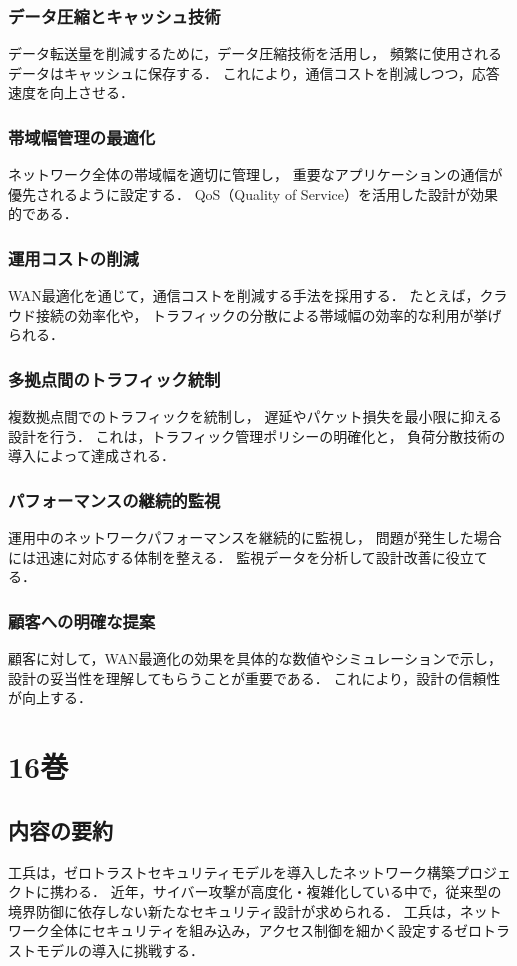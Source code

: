 \documentclass[titlepage,a4paper]{jsarticle}
\begin{document}
\subsubsection{データ圧縮とキャッシュ技術}
データ転送量を削減するために，データ圧縮技術を活用し，
頻繁に使用されるデータはキャッシュに保存する．
これにより，通信コストを削減しつつ，応答速度を向上させる．

\subsubsection{帯域幅管理の最適化}
ネットワーク全体の帯域幅を適切に管理し，
重要なアプリケーションの通信が優先されるように設定する．
QoS（Quality of Service）を活用した設計が効果的である．

\subsubsection{運用コストの削減}
WAN最適化を通じて，通信コストを削減する手法を採用する．
たとえば，クラウド接続の効率化や，
トラフィックの分散による帯域幅の効率的な利用が挙げられる．

\subsubsection{多拠点間のトラフィック統制}
複数拠点間でのトラフィックを統制し，
遅延やパケット損失を最小限に抑える設計を行う．
これは，トラフィック管理ポリシーの明確化と，
負荷分散技術の導入によって達成される．

\subsubsection{パフォーマンスの継続的監視}
運用中のネットワークパフォーマンスを継続的に監視し，
問題が発生した場合には迅速に対応する体制を整える．
監視データを分析して設計改善に役立てる．

\subsubsection{顧客への明確な提案}
顧客に対して，WAN最適化の効果を具体的な数値やシミュレーションで示し，
設計の妥当性を理解してもらうことが重要である．
これにより，設計の信頼性が向上する．
\newpage
\section{16巻}
\subsection{内容の要約}
工兵は，ゼロトラストセキュリティモデルを導入したネットワーク構築プロジェクトに携わる．
近年，サイバー攻撃が高度化・複雑化している中で，従来型の境界防御に依存しない新たなセキュリティ設計が求められる．
工兵は，ネットワーク全体にセキュリティを組み込み，アクセス制御を細かく設定するゼロトラストモデルの導入に挑戦する．
\end{document}
